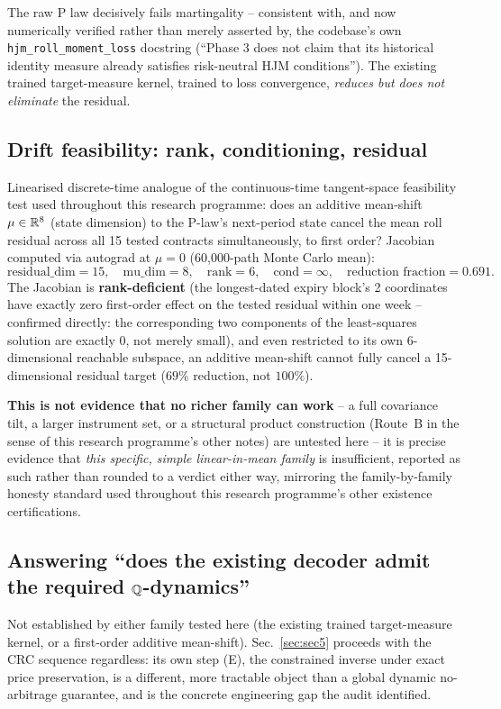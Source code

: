 The raw P law decisively fails martingality -- consistent with, and now
numerically verified rather than merely asserted by, the codebase's own
\texttt{hjm\_roll\_moment\_loss} docstring (``Phase 3 does not claim that its
historical identity measure already satisfies risk-neutral HJM
conditions''). The existing trained target-measure kernel, trained to loss
convergence, \emph{reduces but does not eliminate} the residual.

\subsection{Drift feasibility: rank, conditioning, residual}

Linearised discrete-time analogue of the continuous-time tangent-space
feasibility test used throughout this research programme: does an additive
mean-shift $\mu\in\mathbb R^{8}$ (state dimension) to the P-law's next-period state
cancel the mean roll residual across all 15 tested contracts simultaneously,
to first order? Jacobian computed via autograd at $\mu=0$ (60{,}000-path
Monte Carlo mean):
\[
\text{residual\_dim}=15,\quad \text{mu\_dim}=8,\quad
\boxed{\text{rank}=6},\quad \text{cond}=\infty,\quad
\boxed{\text{reduction fraction}=0.691}.
\]
The Jacobian is \textbf{rank-deficient} (the longest-dated expiry block's 2
coordinates have exactly zero first-order effect on the tested residual
within one week -- confirmed directly: the corresponding two components of
the least-squares solution are exactly $0$, not merely small), and even
restricted to its own 6-dimensional reachable subspace, an additive mean-shift
cannot fully cancel a 15-dimensional residual target ($69\%$ reduction, not
$100\%$).

\textbf{This is not evidence that no richer family can work} -- a full
covariance tilt, a larger instrument set, or a structural product
construction (Route~B in the sense of this research programme's other
notes) are untested here -- it is precise evidence that \emph{this specific,
simple linear-in-mean family} is insufficient, reported as such rather than
rounded to a verdict either way, mirroring the family-by-family honesty
standard used throughout this research programme's other existence
certifications.

\subsection{Answering ``does the existing decoder admit the required \texorpdfstring{$\mathbb Q$}{Q}-dynamics''}

Not established by either family tested here (the existing trained
target-measure kernel, or a first-order additive mean-shift). Sec.~\ref{sec:sec5}
proceeds with the CRC sequence regardless: its own step (E), the constrained
inverse under exact price preservation, is a different, more tractable
object than a global dynamic no-arbitrage guarantee, and is the concrete
engineering gap the audit identified.
